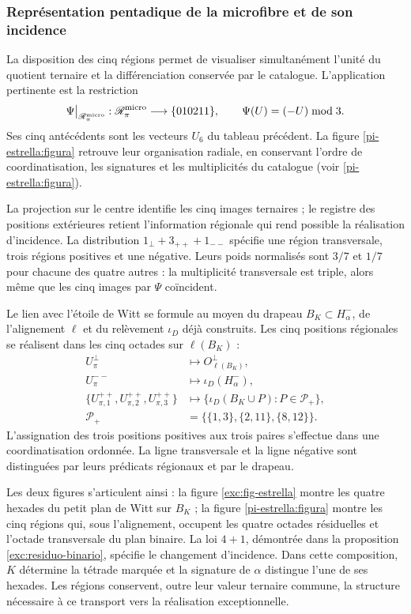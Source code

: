 \subsubsection{Représentation pentadique de la microfibre et de son incidence}
\label{pi-estrella:desarrollo}

La disposition des cinq régions permet de visualiser simultanément
l'unité du quotient ternaire et la différenciation conservée par le
catalogue. L'application pertinente est la restriction
\[
 \Psi\big|_{\mathscr R_\pi^{\rm micro}}:
 \mathscr R_\pi^{\rm micro}\longrightarrow\{010211\},
 \qquad \Psi(U)=(-U)\bmod3.
\]
Ses cinq antécédents sont les vecteurs \(U_6\) du tableau précédent.
La figure \ref{pi-estrella:figura} retrouve leur organisation radiale,
en conservant l’ordre de coordinatisation, les signatures et les multiplicités du
catalogue (voir \ref{pi-estrella:figura}).



La projection sur le centre identifie les cinq images ternaires ; le
registre des positions extérieures retient l'information régionale
qui rend possible la réalisation d'incidence. La distribution
\(1_\perp+3_{++}+1_{--}\) spécifie une région transversale, trois
régions positives et une négative. Leurs poids normalisés sont
\(3/7\) et \(1/7\) pour chacune des quatre autres : la
multiplicité transversale est triple, alors même que les cinq images par
\(\Psi\) coïncident.

Le lien avec l'étoile de Witt se formule au moyen du drapeau
\(B_K\subset H^-_\alpha\), de l'alignement \(\ell\) et du
relèvement \(\iota_D\) déjà construits. Les cinq positions régionales
se réalisent dans les cinq octades sur \(\ell(B_K)\) :
\[
\begin{aligned}
 U_\pi^\perp&\longmapsto O^\perp_{\ell(B_K)},\\
 U_\pi^{--}&\longmapsto\iota_D(H^-_\alpha),\\
 \{U_{\pi,1}^{++},U_{\pi,2}^{++},U_{\pi,3}^{++}\}
 &\longmapsto
 \{\iota_D(B_K\cup P):P\in\mathcal P_+\},\\
 \mathcal P_+&=\bigl\{\{1,3\},\{2,11\},\{8,12\}\bigr\}.
\end{aligned}
\]
L'assignation des trois positions positives aux trois paires
s'effectue dans une coordinatisation ordonnée. La ligne transversale et la ligne négative
sont distinguées par leurs prédicats régionaux et par le drapeau.

Les deux figures s'articulent ainsi : la figure
\ref{exc:fig-estrella} montre les quatre hexades du petit plan
de Witt sur \(B_K\) ; la figure \ref{pi-estrella:figura} montre
les cinq régions qui, sous l'alignement, occupent les quatre octades
résiduelles et l'octade transversale du plan binaire. La loi
\(4+1\), démontrée dans la proposition
\ref{exc:residuo-binario}, spécifie le changement d'incidence. Dans cette
composition, \(K\) détermine la tétrade marquée et la signature de
\(\alpha\) distingue l'une de ses hexades. Les régions conservent,
outre leur valeur ternaire commune, la structure nécessaire à ce
transport vers la réalisation exceptionnelle.
